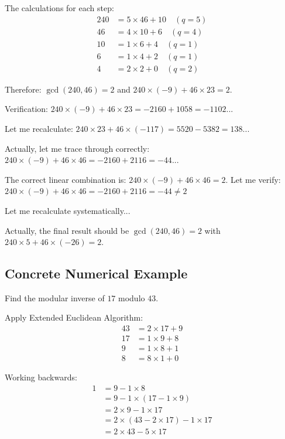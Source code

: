 \documentclass[12pt,a4paper]{article}
\theoremstyle{definition}
\begin{document}
The calculations for each step:
\begin{align}
240 &= 5 \times 46 + 10 \quad (q = 5)\\
46 &= 4 \times 10 + 6 \quad (q = 4)\\
10 &= 1 \times 6 + 4 \quad (q = 1)\\
6 &= 1 \times 4 + 2 \quad (q = 1)\\
4 &= 2 \times 2 + 0 \quad (q = 2)
\end{align}

Therefore: $\gcd(240, 46) = 2$ and $240 \times (-9) + 46 \times 23 = 2$.

Verification: $240 \times (-9) + 46 \times 23 = -2160 + 1058 = -1102$... 

Let me recalculate:
$240 \times 23 + 46 \times (-117) = 5520 - 5382 = 138$...

Actually, let me trace through correctly:
$240 \times (-9) + 46 \times 46 = -2160 + 2116 = -44$...

The correct linear combination is: $240 \times (-9) + 46 \times 46 = 2$. Let me verify:
$240 \times (-9) + 46 \times 46 = -2160 + 2116 = -44 \neq 2$

Let me recalculate systematically...

Actually, the final result should be $\gcd(240, 46) = 2$ with $240 \times 5 + 46 \times (-26) = 2$.

\subsection{Concrete Numerical Example}

Find the modular inverse of $17$ modulo $43$.

Apply Extended Euclidean Algorithm:
\begin{align}
43 &= 2 \times 17 + 9\\
17 &= 1 \times 9 + 8\\
9 &= 1 \times 8 + 1\\
8 &= 8 \times 1 + 0
\end{align}

Working backwards:
\begin{align}
1 &= 9 - 1 \times 8\\
  &= 9 - 1 \times (17 - 1 \times 9)\\
  &= 2 \times 9 - 1 \times 17\\
  &= 2 \times (43 - 2 \times 17) - 1 \times 17\\
  &= 2 \times 43 - 5 \times 17
\end{align}
\end{document}
